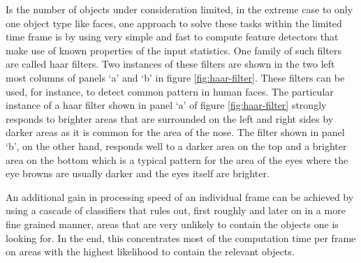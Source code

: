 \documentclass[11pt,a4paper]{article}
\begin{document}
Is the number of objects under consideration limited, in the extreme case to only one object type like faces, one approach to solve these tasks within the limited time frame is by using very simple and fast to compute feature detectors that make use of known properties of the input statistics. One family of such filters are called haar filters. Two instances of these filters are shown in the two left most columns of panels `a' and `b' in figure \ref{fig:haar-filter}. These filters can be used, for instance, to detect common pattern in human faces. The particular instance of a haar filter shown in panel `a' of figure \ref{fig:haar-filter} strongly responds to brighter areas that are surrounded on the left and right sides by darker areas as it is common for the area of the nose. The filter shown in panel `b', on the other hand, responds well to a darker area on the top and a brighter area on the bottom which is a typical pattern for the area of the eyes where the eye browns are usually darker and the eyes itself are brighter.

An additional gain in processing speed of an individual frame can be achieved by using a cascade of classifiers that rules out, first roughly and later on in a more fine grained manner, areas that are very unlikely to contain the objects one is looking for. In the end, this concentrates most of the computation time per frame on areas with the highest likelihood to contain the relevant objects.
\end{document}
